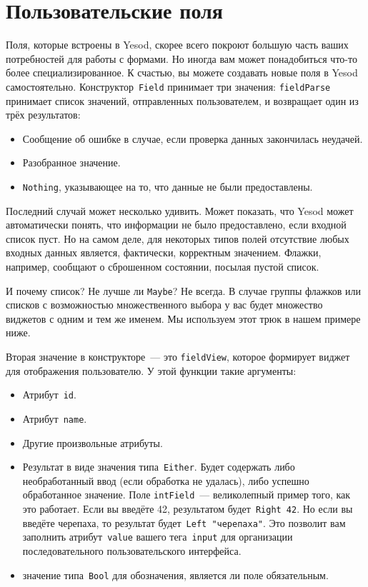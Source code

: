 \section{Пользовательские поля}
Поля, которые встроены в Yesod, скорее всего покроют большую часть ваших
потребностей для работы с формами. Но иногда вам может понадобиться что-то
более специализированное.  К счастью, вы можете создавать новые поля в Yesod
самостоятельно. Конструктор~\lstinline'Field' принимает три значения:
\lstinline'fieldParse' принимает список значений, отправленных пользователем,
и возвращает один из трёх результатов:
\begin{itemize}
    \item Сообщение об ошибке в случае, если проверка данных закончилась
        неудачей.

    \item Разобранное значение.

    \item \lstinline'Nothing', указывающее на то, что данные не были
        предоставлены.
\end{itemize}

Последний случай может несколько удивить. Может показать, что Yesod может
автоматически понять, что информации не было предоставлено, если входной список
пуст. Но на самом деле, для некоторых типов полей отсутствие любых входных
данных является, фактически, корректным значением. Флажки, например, сообщают о
сброшенном состоянии, посылая пустой список.

И почему список? Не лучше ли \lstinline'Maybe'? Не всегда. В случае группы
флажков или списков с возможностью множественного выбора у вас будет множество
виджетов с одним и тем же именем. Мы используем этот трюк в нашем примере ниже.

Вторая значение в конструкторе~--- это \lstinline'fieldView', которое формирует
виджет для отображения пользователю. У этой функции такие аргументы:
\begin{itemize}
    \item Атрибут~\texttt{id}.

    \item Атрибут~\texttt{name}.

    \item Другие произвольные атрибуты.

    \item Результат в виде значения типа~\lstinline'Either'. Будет содержать либо
        необработанный ввод (если обработка не удалась), либо успешно
        обработанное значение. Поле \lstinline'intField'~--- великолепный
        пример того, как это работает. Если вы введёте \textrm{42}, результатом
        будет~\lstinline'Right 42'. Но если вы введёте \textrm{черепаха}, то
        результат будет~\lstinline'Left "черепаха"'. Это позволит вам заполнить
        атрибут~\texttt{value} вашего тега~\texttt{input} для организации
        последовательного пользовательского интерфейса.

    \item значение типа~\lstinline'Bool' для обозначения, является ли поле
        обязательным.
\end{itemize}

